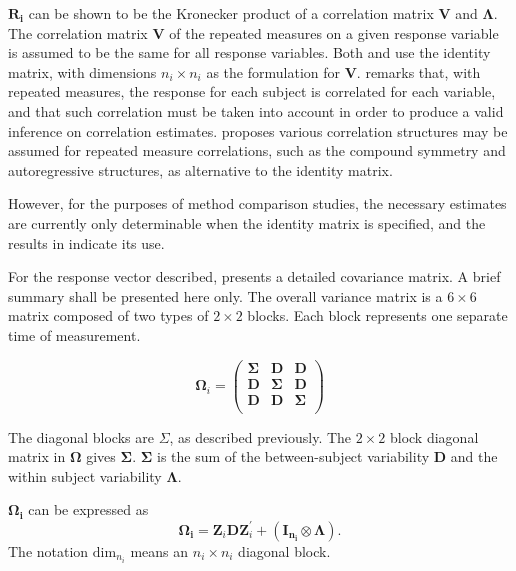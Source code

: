 \documentclass[12pt, a4paper]{report}
\theoremstyle{plain}
\theoremstyle{definition}
\theoremstyle{remark}
\begin{document}
$\boldsymbol{R_{i}}$ can be shown to be the Kronecker product of a correlation matrix $\boldsymbol{V}$ and $\boldsymbol{\Lambda}$. The correlation matrix $\boldsymbol{V}$ of the repeated measures on a given response variable is assumed to be the same for all response variables. Both \citet{hamlett} and \citet{lam} use the identity matrix, with dimensions $n_{i} \times n_{i}$ as the formulation for $\boldsymbol{V}$. \citet{roy} remarks that, with repeated measures, the response for each subject is correlated for each variable, and that such correlation must be taken into account in order to produce a valid inference on correlation estimates.  \citet{roy2006} proposes various correlation structures may be assumed for repeated measure correlations, such as the compound symmetry and autoregressive structures, as alternative to the identity matrix.

However, for the purposes of method comparison studies, the necessary estimates are currently only determinable when the identity matrix is specified, and the results in \citet{roy} indicate its use.

For the response vector described, \citet{hamlett} presents a detailed covariance matrix. A brief summary shall be presented here only. The overall variance matrix is a $6 \times 6$ matrix composed of two types of $2 \times 2$ blocks. Each block represents one separate time of measurement.

\[
\boldsymbol{\Omega}_{i} = \left(
\begin{array}{ccc}
\boldsymbol{\Sigma} & \boldsymbol{D} & \boldsymbol{D}\\
\boldsymbol{D} & \boldsymbol{\Sigma} & \boldsymbol{D}\\
\boldsymbol{D} & \boldsymbol{D} & \boldsymbol{\Sigma}\\
\end{array}\right)
\]

The diagonal blocks are $\Sigma$, as described previously. The $2 \times 2$ block diagonal matrix in $\boldsymbol{\Omega}$ gives $\boldsymbol{\Sigma}$. $\boldsymbol{\Sigma}$ is the sum of the between-subject variability $\boldsymbol{D}$ and the within subject variability $\boldsymbol{\Lambda}$.

$\boldsymbol{\Omega_{i}}$ can be expressed as
\[
\boldsymbol{\Omega_{i}} = \boldsymbol{Z}_{i}\boldsymbol{D}\boldsymbol{Z}_{i}^\prime + ({\boldsymbol{I_{n_{i}}} \otimes \boldsymbol{\Lambda}}).
\]
The notation $\mbox{dim}_{n_{i}}$ means an $n_{i} \times n_{i}$ diagonal block.
\end{document}
